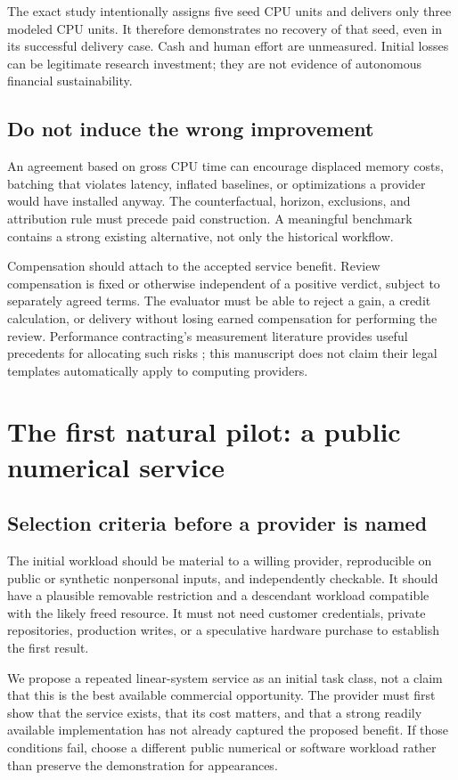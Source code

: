 \documentclass[11pt,letterpaper]{article}
\theoremstyle{remark}\newtheorem{remark}{Remark}[section]
\begin{document}
The exact study intentionally assigns five seed CPU units and delivers only three modeled CPU units. It therefore demonstrates no recovery of that seed, even in its successful delivery case. Cash and human effort are unmeasured. Initial losses can be legitimate research investment; they are not evidence of autonomous financial sustainability.

\subsection{Do not induce the wrong improvement}
An agreement based on gross CPU time can encourage displaced memory costs, batching that violates latency, inflated baselines, or optimizations a provider would have installed anyway. The counterfactual, horizon, exclusions, and attribution rule must precede paid construction. A meaningful benchmark contains a strong existing alternative, not only the historical workflow.

Compensation should attach to the accepted service benefit. Review compensation is fixed or otherwise independent of a positive verdict, subject to separately agreed terms. The evaluator must be able to reject a gain, a credit calculation, or delivery without losing earned compensation for performing the review. Performance contracting's measurement literature provides useful precedents for allocating such risks \citep{doeMV,doeWitness}; this manuscript does not claim their legal templates automatically apply to computing providers.

\section{The first natural pilot: a public numerical service}
\label{sec:pilot}
\subsection{Selection criteria before a provider is named}
The initial workload should be material to a willing provider, reproducible on public or synthetic nonpersonal inputs, and independently checkable. It should have a plausible removable restriction and a descendant workload compatible with the likely freed resource. It must not need customer credentials, private repositories, production writes, or a speculative hardware purchase to establish the first result.

We propose a repeated linear-system service as an initial task class, not a claim that this is the best available commercial opportunity. The provider must first show that the service exists, that its cost matters, and that a strong readily available implementation has not already captured the proposed benefit. If those conditions fail, choose a different public numerical or software workload rather than preserve the demonstration for appearances.
\end{document}
